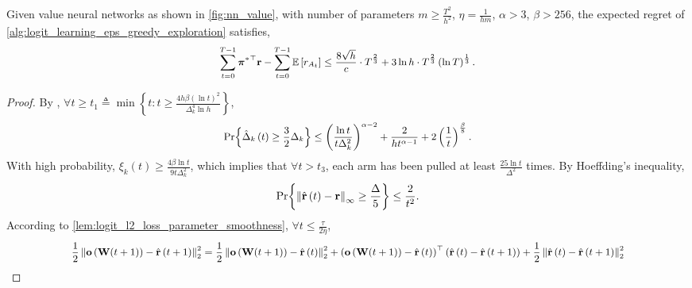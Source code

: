 \begin{thm}
\label{thm:logit_learning_main_result}
    Given value neural networks as shown in \cref{fig:nn_value}, with number of parameters $m \ge \frac{T^2}{h^2}$, $\eta = \frac{1}{h m}$, $\alpha > 3$, $\beta > 256$, the expected regret of \cref{alg:logit_learning_eps_greedy_exploration} satisfies,
\begin{equation*}
\small
\begin{split}
    \sum\limits_{t=0}^{T-1}{ {\rvpi^*}^\top \rvr } - \sum\limits_{t=0}^{T-1}{ \sE \left[ r_{A_t} \right] } \le \frac{8 \sqrt{h}}{c} \cdot T^{\frac{2}{3}} + 3 \ln{h} \cdot T^{\frac{2}{3}} \left(\ln{T}\right)^{\frac{1}{3}}.
\end{split}
\end{equation*}
\end{thm}
\begin{proof}
    By \citep{seldin2017improved},
    $\forall t \ge t_1 \triangleq \min{\left\{ t : t \ge \frac{4 h \beta \left(\ln{t}\right)^2}{\Delta_k^4 \ln{h}} \right\}}$,
\begin{equation*}
\small
\begin{split}
    \pr{\left\{ \hat{\Delta}_k\left(t\right) \ge \frac{3}{2} \Delta_k \right\}} \le \left( \frac{\ln{t}}{t \Delta_k^2} \right)^{\alpha - 2} + \frac{2}{h t^{\alpha - 1}} + 2 \left(\frac{1}{t}\right)^{\frac{\beta}{8}}.
\end{split}
\end{equation*}
With high probability, $\xi_k\left(t\right) \ge \frac{4 \beta \ln{t}}{9 t \Delta_k^2}$, which implies that $\forall t > t_3$,  each arm has been pulled at least $\frac{25\ln{t}}{\Delta^2}$ times. By Hoeffding's inequality,
\begin{equation*}
\begin{split}
    {\text{Pr}}{\left\{ \left\| \hat{{\mathbf{r}}}\left(t\right) - {\mathbf{r}}\right\|_\infty \ge \frac{\Delta}{5} \right\}} \le \frac{2}{t^2}.
\end{split}
\end{equation*}
According to \cref{lem:logit_l2_loss_parameter_smoothness}, $\forall t \le \frac{\tau}{2 \eta}$,
\begin{equation*}
\small
\begin{split}
    \frac{1}{2} \left\| \rvo\left( \rmW(t+1) \right) - \hat{\rvr}\left(t+1\right)\right\|_2^2 &= \frac{1}{2} \left\| \rvo\left( \rmW(t+1) \right) - \hat{\rvr}\left(t\right)\right\|_2^2 + \left( \rvo\left( \rmW(t+1) \right) - \hat{\rvr}\left(t\right) \right)^\top \left( \hat{\rvr}\left(t\right) - \hat{\rvr}\left(t+1\right) \right) + \frac{1}{2} \left\| \hat{\rvr}\left(t\right) - \hat{\rvr}\left(t+1\right) \right\|_2^2 \\

\end{split}
\end{equation*}
\end{proof}
